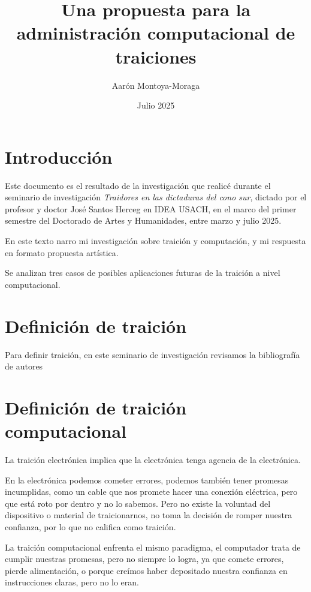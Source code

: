 \documentclass{article}
\title{Una propuesta para la administración computacional de traiciones}
\author{Aarón Montoya-Moraga}
\date{Julio 2025}
\begin{document}
\maketitle

\renewcommand*\contentsname{Tabla de contenidos}

\tableofcontents

\clearpage

\section{Introducción}

Este documento es el resultado de la investigación que realicé durante el seminario de investigación \textit{Traidores en las dictaduras del cono sur}, dictado por el profesor y doctor José Santos Herceg en IDEA USACH, en el marco del primer semestre del Doctorado de Artes y Humanidades, entre marzo y julio 2025.

En este texto narro mi investigación sobre traición y computación, y mi respuesta en formato propuesta artística.

Se analizan tres casos de posibles aplicaciones futuras de la traición a nivel computacional.

\clearpage

\section{Definición de traición}

Para definir traición, en este seminario de investigación revisamos la bibliografía de autores 

\section{Definición de traición computacional}

La traición electrónica implica que la electrónica tenga agencia de la electrónica.

En la electrónica podemos cometer errores, podemos también tener promesas incumplidas, como un cable que nos promete hacer una conexión eléctrica, pero que está roto por dentro y no lo sabemos. Pero no existe la voluntad del dispositivo o material de traicionarnos, no toma la decisión de romper nuestra confianza, por lo que no califica como traición.

La traición computacional enfrenta el mismo paradigma, el computador trata de cumplir nuestras promesas, pero no siempre lo logra, ya que comete errores, pierde alimentación, o porque creímos haber depositado nuestra confianza en instrucciones claras, pero no lo eran.
\end{document}
